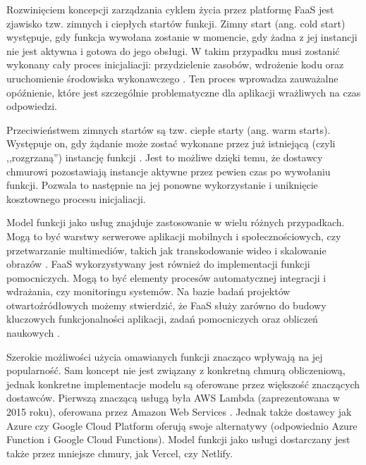 Rozwinięciem koncepcji zarządzania cyklem życia przez platformę FaaS jest zjawisko tzw. zimnych i ciepłych startów funkcji.
Zimny start (ang. cold start) występuje, gdy funkcja wywołana zostanie w momencie, gdy żadna z jej instancji nie jest aktywna i gotowa do jego obsługi.
W takim przypadku musi zostanić wykonany cały proces inicjaliacji: przydzielenie zasobów, wdrożenie kodu oraz uruchomienie środowiska wykonawczego \cite{SpecRgCloudGroupVisionOnThePerformanceChallengesOfFaas}.
Ten proces wprowadza zauważalne opóźnienie, które jest szczególnie problematyczne dla aplikacji wrażliwych na czas odpowiedzi.

Przeciwieństwem zimnych startów są tzw. ciepłe starty (ang. warm starts).
Występuje on, gdy żądanie może zostać wykonane przez już istniejącą (czyli ,,rozgrzaną'') instancję funkcji \cite{SpecRgCloudGroupVisionOnThePerformanceChallengesOfFaas}.
Jest to możliwe dzięki temu, że dostawcy chmurowi pozostawiają instancje aktywne przez pewien czas po wywołaniu funkcji.
Pozwala to następnie na jej ponowne wykorzystanie i uniknięcie kosztownego procesu inicjaliacji.

Model funkcji jako usług znajduje zastosowanie w wielu różnych przypadkach.
Mogą to być warstwy serwerowe aplikacji mobilnych i społecznościowych, czy przetwarzanie multimediów, takich jak transkodowanie wideo i skalowanie obrazów \cite{ServerlessApplicationsWhyWhenAndHow}.
FaaS wykorzystywany jest również do implementacji funkcji pomocniczych.
Mogą to być elementy procesów automatycznej integracji i wdrażania, czy monitoringu systemów. 
Na bazie badań projektów otwartoźródłowych możemy stwierdzić, że FaaS służy zarówno do budowy kluczowych funkcjonalności aplikacji, zadań pomocniczych oraz obliczeń naukowych \cite{ServerlessApplicationsWhyWhenAndHow}.

Szerokie możliwości użycia omawianych funkcji znacząco wpływają na jej popularność. 
Sam koncept nie jest związany z konkretną chmurą obliczeniową, jednak konkretne implementacje modelu są oferowane przez większość znaczących dostawców.
Pierwszą znaczącą usługą była AWS Lambda (zaprezentowana w 2015 roku), oferowana przez Amazon Web Services \cite{Ekwe_Ekwe_2024}.
Jednak także dostawcy jak Azure czy Google Cloud Platform oferują swoje alternatywy (odpowiednio Azure Function i Google Cloud Functions).
Model funkcji jako usługi dostarczany jest także przez mniejsze chmury, jak Vercel, czy Netlify.
